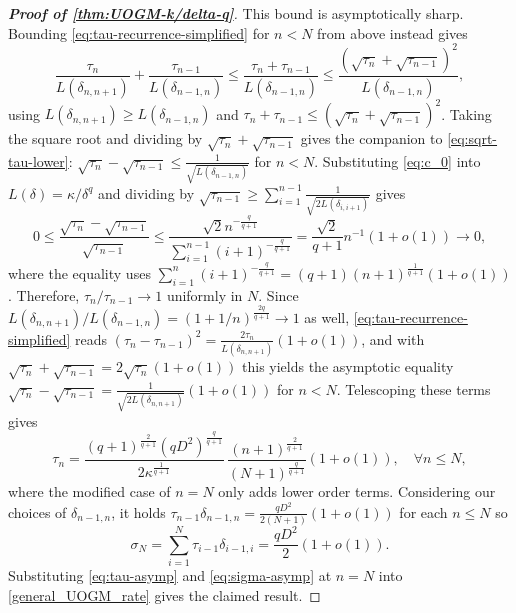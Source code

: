\documentclass[11pt, hidelinks]{article}
\numberwithin{equation}{section}
\theoremstyle{thmstyletwo}%
\numberwithin{equation}{section}
\begin{document}
\begin{proof}[\bf Proof of \cref{thm:UOGM-k/delta-q}]
This bound is asymptotically sharp. Bounding
\eqref{eq:tau-recurrence-simplified} for $n < N$ from above instead gives
$$
\frac{\tau_n}{L(\delta_{n,n+1})}+\frac{\tau_{n-1}}{L(\delta_{n-1,n})}
\leq \frac{\tau_n+\tau_{n-1}}{L(\delta_{n-1,n})}
\leq\frac{\left(\sqrt{\tau_n}+\sqrt{\tau_{n-1}}\right)^2}{L(\delta_{n-1,n})},
$$
using $L(\delta_{n,n+1})\ge L(\delta_{n-1,n})$ and
$\tau_n+\tau_{n-1}\le(\sqrt{\tau_n}+\sqrt{\tau_{n-1}})^2$. Taking the square root
and dividing by $\sqrt{\tau_n}+\sqrt{\tau_{n-1}}$ gives the companion to
\eqref{eq:sqrt-tau-lower}: $\sqrt{\tau_n}-\sqrt{\tau_{n-1}}\leq\frac{1}{\sqrt{L(\delta_{n-1,n})}}$ for $n < N$.
Substituting \eqref{eq:c_0} into $L(\delta)=\kappa/\delta^q$ and dividing by $\sqrt{\tau_{n-1}} \geq \sum_{i=1}^{n-1} \frac{1}{\sqrt{2L(\delta_{i,i+1})}}$ gives
$$
0\leq\frac{\sqrt{\tau_n}-\sqrt{\tau_{n-1}}}{\sqrt{\tau_{n-1}}}
\leq\frac{\sqrt{2}n^{-\frac{q}{q+1}}}{\sum_{i=1}^{n-1}(i+1)^{-\frac{q}{q+1}}}
=\frac{\sqrt{2}}{q+1}n^{-1}\left(1+o(1)\right)
\to 0,
$$
where the equality uses
$\sum_{i=1}^{n}(i+1)^{-\frac{q}{q+1}}=(q+1)(n+1)^{\frac{1}{q+1}}(1+o(1))$.
Therefore, $\tau_n/\tau_{n-1}\to1$ uniformly in $N$. Since
$L(\delta_{n,n+1})/L(\delta_{n-1,n})=(1+1/n)^{\frac{2q}{q+1}}\to1$ as well,
\eqref{eq:tau-recurrence-simplified} reads
$(\tau_n-\tau_{n-1})^2=\frac{2\tau_n}{L(\delta_{n,n+1})}(1+o(1))$, and with
$\sqrt{\tau_n}+\sqrt{\tau_{n-1}}=2\sqrt{\tau_n}(1+o(1))$ this yields the asymptotic
equality $\sqrt{\tau_n}-\sqrt{\tau_{n-1}}=\frac{1}{\sqrt{2L(\delta_{n,n+1})}}(1+o(1))$
for $n<N$. Telescoping these terms gives 
\begin{equation}\label{eq:tau-asymp}
\tau_n=\frac{(q+1)^\frac{2}{q+1}\left(q D^2\right)^{\frac{q}{q+1}}}{2\kappa^\frac{1}{q+1}} \, \frac{(n+1)^{\frac{2}{q+1}}}{(N+1)^{\frac{q}{q+1}}}\left(1+o(1)\right), \quad \forall n \leq N,
\end{equation}
where the modified case of $n=N$ only adds lower order terms.
Considering our choices of $\delta_{n-1,n}$, it holds $\tau_{n-1}\delta_{n-1,n} = \frac{qD^2}{2(N+1)}(1+o(1))$ for each $n \leq N$ so
\begin{equation}\label{eq:sigma-asymp}
\sigma_N = \sum_{i=1}^N \tau_{i-1}\delta_{i-1,i} =\frac{ qD^2}{2}\left(1+o(1)\right).
\end{equation}
Substituting \eqref{eq:tau-asymp} and \eqref{eq:sigma-asymp} at $n=N$ into \eqref{general_UOGM_rate} gives the claimed result.
\end{proof}
\end{document}
